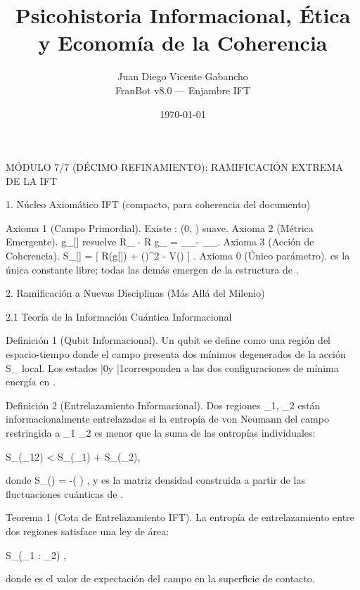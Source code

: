 \documentclass[12pt,a4paper]{book}
\title{Psicohistoria Informacional, Ética y Economía de la Coherencia}
\author{Juan Diego Vicente Gabancho \\ FranBot v8.0 — Enjambre IFT}
\date{\today}
\begin{document}
\maketitle
\tableofcontents
MÓDULO 7/7 (DÉCIMO REFINAMIENTO): RAMIFICACIÓN EXTREMA DE LA IFT

1. Núcleo Axiomático IFT (compacto, para coherencia del documento)

Axioma 1 (Campo Primordial). Existe  \rho :  \to (0, \infty)  suave.
Axioma 2 (Métrica Emergente).  g_{\mu\nu}[\rho]  resuelve  R_{\mu\nu} - R g_{\mu\nu} = \nabla_\mu\nabla_\nu\rho - \nabla_\mu\rho\nabla_\nu\rho .
Axioma 3 (Acción de Coherencia).  S_{}[\rho] = \int {} [ R(g[\rho]) + (\nabla\sqrt{\rho})^2 - V(\sqrt{\rho}) ] .
Axioma 0 (Único parámetro).  \kappa  es la única constante libre; todas las demás emergen de la estructura de  \rho .

2. Ramificación a Nuevas Disciplinas (Más Allá del Milenio)

2.1 Teoría de la Información Cuántica Informacional

Definición 1 (Qubit Informacional). Un qubit se define como una región del espacio-tiempo  \Omega  donde el campo  \rho  presenta dos mínimos degenerados de la acción  S_{}  local. Los estados  |0\rangle  y  |1\rangle  corresponden a las dos configuraciones de mínima energía en  \Omega .

Definición 2 (Entrelazamiento Informacional). Dos regiones  \Omega_1, \Omega_2  están informacionalmente entrelazadas si la entropía de von Neumann del campo  \rho  restringida a  \Omega_1 \cup \Omega_2  es menor que la suma de las entropías individuales:

S_{}(\rho_{12}) < S_{}(\rho_1) + S_{}(\rho_2),
\]  

donde  S_{}(\rho) = -(\hat{\rho} \log \hat{\rho}) , y  \hat{\rho}  es la matriz densidad construida a partir de las fluctuaciones cuánticas de  \rho .

Teorema 1 (Cota de Entrelazamiento IFT). La entropía de entrelazamiento entre dos regiones satisface una ley de área:

S_{}(\Omega_1 : \Omega_2) \le {} \cdot \langle \rho \rangle,
\]  

donde  \langle \rho \rangle  es el valor de expectación del campo en la superficie de contacto.
\end{document}
